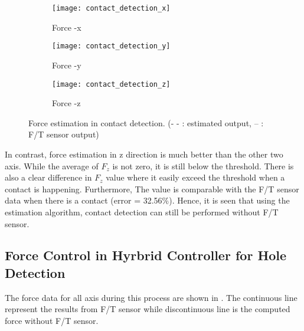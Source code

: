 \begin{figure}[h]
  \begin{subfigure}[t]{0.5\textwidth}
    \centering
    \texttt{[image: contact\_detection\_x]} 
    \caption{Force -x}
  \end{subfigure}
  \begin{subfigure}[t]{0.5\textwidth}
    \centering
    \texttt{[image: contact\_detection\_y]}
    \caption{Force -y}
  \end{subfigure}
  \begin{subfigure}[t]{0.5\textwidth}
    \centering
    \texttt{[image: contact\_detection\_z]}
    \caption{Force -z}
  \end{subfigure}  
  \caption{Force estimation in contact detection. (- - : estimated output, -- : F/T sensor output)}
  \label{fig:contact detection}
\end{figure}

In contrast, force estimation in z direction is much better than the other two axis. While the average of $F_{z}$ is not zero, it is still below the threshold. There is also a clear difference in $F_{z}$ value where it easily exceed the threshold when a contact is happening. Furthermore, The value is comparable with the F/T sensor data when there is a contact (error = 32.56$\%$). Hence, it is seen that using the estimation algorithm, contact detection can still be performed without F/T sensor.


\subsection{Force Control in Hyrbrid Controller for Hole Detection}

The force data for all axis during this process are shown in . The continuous line represent the results from F/T sensor while discontinuous line is the computed force without F/T sensor.


